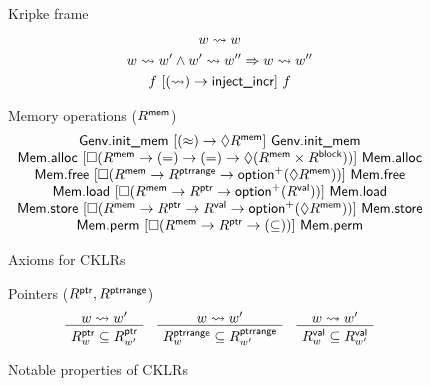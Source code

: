 \begin{figure}[p] %
  Kripke frame
  \vspace{1em}
  \begin{gather*}
    w \leadsto w \\
    w \leadsto w' \wedge w' \leadsto w'' \Rightarrow w \leadsto w'' \\
    f \ [{(\leadsto) \rightarrow  \textsf{inject\_incr} }]\  f
  \end{gather*}

  \vspace{2em}
  Memory operations ($R^{ \textsf{mem} }$)
  \vspace{1em}
  \[
    \begin{array}{c}
       \textsf{Genv.init\_mem} 
      \ [{(\approx) \rightarrow \Diamond R^{ \textsf{mem} }}]\ 
       \textsf{Genv.init\_mem} 
      \\
       \textsf{Mem.alloc} 
      \ [{\Box(R^{ \textsf{mem} } \rightarrow (=) \rightarrow (=) \rightarrow
        \Diamond (R^{ \textsf{mem} } \times R^{ \textsf{block} }))}]\ 
       \textsf{Mem.alloc} 
      \\
       \textsf{Mem.free} 
      \ [{\Box(R^{ \textsf{mem} } \rightarrow R^{ \textsf{ptrrange} } \rightarrow
         \textsf{option} ^+(\Diamond R^{ \textsf{mem} }))}]\ 
       \textsf{Mem.free} 
      \\
       \textsf{Mem.load} 
      \ [{\Box(R^{ \textsf{mem} } \rightarrow R^{ \textsf{ptr} } \rightarrow
         \textsf{option} ^+(R^{ \textsf{val} }))}]\ 
       \textsf{Mem.load} 
      \\
       \textsf{Mem.store} 
      \ [{\Box(R^{ \textsf{mem} } \rightarrow R^{ \textsf{ptr} } \rightarrow R^{ \textsf{val} } \rightarrow
         \textsf{option} ^+(\Diamond R^{ \textsf{mem} }))}]\ 
       \textsf{Mem.store} 
      \\
       \textsf{Mem.perm} 
      \ [{\Box(R^{ \textsf{mem} } \rightarrow R^{ \textsf{ptr} } \rightarrow (\subseteq))}]\ 
       \textsf{Mem.perm} 
    \end{array}
  \]
  \caption{Axioms for CKLRs}
  \label{fig:cklr-axioms}
\end{figure}

\begin{figure} %
  \vspace{2em}
  Pointers ($R^{ \textsf{ptr} }, R^{ \textsf{ptrrange} }$)
  \vspace{1em}
  \vspace{1em}
  \[
    \AxiomC{$w \leadsto w'$}
    \UnaryInfC{$R^\kw{ptr}_w \subseteq R^\kw{ptr}_{w'}$}
    \DisplayProof
    \quad
    \AxiomC{$w \leadsto w'$}
    \UnaryInfC{$R^\kw{ptrrange}_w \subseteq R^\kw{ptrrange}_{w'}$}
    \DisplayProof
    \quad
    \AxiomC{$w \leadsto w'$}
    \UnaryInfC{$R^\kw{val}_w \subseteq R^\kw{val}_{w'}$}
    \DisplayProof
  \]
  \caption{Notable properties of CKLRs}
  \label{fig:cklr-props}
\end{figure}

